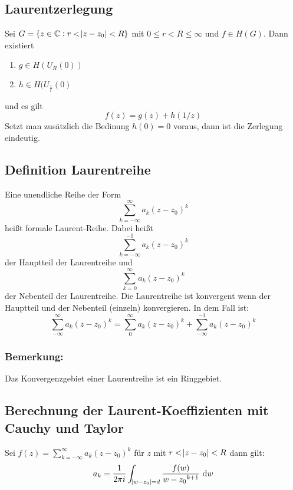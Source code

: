 \subsection{Laurentzerlegung}
Sei $G = \{z \in \mathbb{C}: r<\abs{z-z_0} < R\}$ mit $0 \leq r < R \leq \infty$ und $f\in H(G)$. Dann existiert
\begin{enumerate}
    \item $g \in H(U_R(0))$
    \item $h \in H(U_{\frac{1}{r}} (0)$
\end{enumerate}
und es gilt
\begin{equation*}
    f(z) = g(z) + h(1/z)
\end{equation*}
Setzt man zusätzlich die Bedinung $h(0) = 0$ voraus, dann ist die Zerlegung eindeutig.

\subsection{Definition Laurentreihe}
Eine unendliche Reihe der Form
\begin{equation*}
    \sum_{k=-\infty}^\infty a_k {(z-z_0)}^k
\end{equation*}
heißt formale Laurent-Reihe. Dabei heißt
\begin{equation*}
    \sum_{k=-\infty}^{-1} a_k {(z-z_0)}^k
\end{equation*}
der Hauptteil der Laurentreihe und
\begin{equation*}
    \sum_{k=0}^\infty a_k {(z-z_0)}^k
\end{equation*}
der Nebenteil der Laurentreihe. Die Laurentreihe ist konvergent wenn der Hauptteil und der Nebenteil (einzeln)
konvergieren. In dem Fall ist:
\begin{equation*}
    \sum_{-\infty}^\infty a_k {(z-z_0)}^k = \sum_{0}^\infty a_k {(z-z_0)}^k + 
        \sum_{-\infty}^{-1} a_k {(z-z_0)}^k
\end{equation*}

\subsubsection{Bemerkung:}
Das Konvergenzgebiet einer Laurentreihe ist ein Ringgebiet.

\subsection{Berechnung der Laurent-Koeffizienten mit Cauchy und Taylor}
Sei $f(z) = \sum_{k=-\infty}^\infty a_k {(z-z_0)}^k$ für $z$ mit $r < \abs{z-z_0} < R$ dann gilt:
\begin{equation*}
    a_k = \frac{1}{2 \pi i} \int_{\abs{w-z_0} = d} \frac{f(w)}{{w-z_0}^{k+1}} \text{ d}w
\end{equation*}


